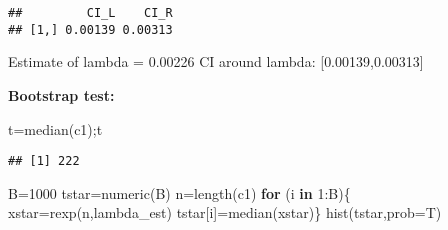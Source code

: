 \documentclass[
]{article}
\newenvironment{Shaded}{\begin{snugshade}}{\end{snugshade}}
\newcommand{\AttributeTok}[1]{\textcolor[rgb]{0.77,0.63,0.00}{#1}}
\newcommand{\CommentTok}[1]{\textcolor[rgb]{0.56,0.35,0.01}{\textit{#1}}}
\newcommand{\ControlFlowTok}[1]{\textcolor[rgb]{0.13,0.29,0.53}{\textbf{#1}}}
\newcommand{\DecValTok}[1]{\textcolor[rgb]{0.00,0.00,0.81}{#1}}
\newcommand{\FloatTok}[1]{\textcolor[rgb]{0.00,0.00,0.81}{#1}}
\newcommand{\FunctionTok}[1]{\textcolor[rgb]{0.00,0.00,0.00}{#1}}
\newcommand{\NormalTok}[1]{#1}
\newcommand{\OtherTok}[1]{\textcolor[rgb]{0.56,0.35,0.01}{#1}}
\newcommand{\SpecialCharTok}[1]{\textcolor[rgb]{0.00,0.00,0.00}{#1}}
\begin{document}
\begin{Shaded}
\end{Shaded}

\begin{verbatim}
##         CI_L    CI_R
## [1,] 0.00139 0.00313
\end{verbatim}

Estimate of lambda = 0.00226 CI around lambda: {[}0.00139,0.00313{]}

\textbf{Bootstrap test:}

\begin{Shaded}
\begin{Highlighting}[]
\NormalTok{t}\OtherTok{=}\FunctionTok{median}\NormalTok{(c1);t}
\end{Highlighting}
\end{Shaded}

\begin{verbatim}
## [1] 222
\end{verbatim}

\begin{Shaded}
\begin{Highlighting}[]
\NormalTok{B}\OtherTok{=}\DecValTok{1000}
\NormalTok{tstar}\OtherTok{=}\FunctionTok{numeric}\NormalTok{(B)}
\NormalTok{n}\OtherTok{=}\FunctionTok{length}\NormalTok{(c1)}
\ControlFlowTok{for}\NormalTok{ (i }\ControlFlowTok{in} \DecValTok{1}\SpecialCharTok{:}\NormalTok{B)\{}
\NormalTok{  xstar}\OtherTok{=}\FunctionTok{rexp}\NormalTok{(n,lambda\_est)}
\NormalTok{  tstar[i]}\OtherTok{=}\FunctionTok{median}\NormalTok{(xstar)\}}
\FunctionTok{hist}\NormalTok{(tstar,}\AttributeTok{prob=}\NormalTok{T)}
\end{Highlighting}
\end{Shaded}
\end{document}
